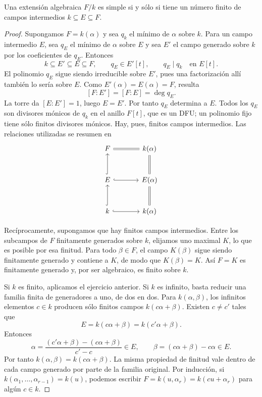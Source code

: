\begin{prop}\label{prop:C26-intermedios-simple}
Una extensión algebraica $F/k$ es simple si y sólo si tiene un número finito de campos intermedios $k\subseteq E\subseteq F$.
\end{prop}
\begin{proof}
Supongamos $F=k(\alpha)$ y sea $q_k$ el mínimo de $\alpha$ sobre $k$. Para un campo intermedio $E$, sea $q_E$ el mínimo de $\alpha$ sobre $E$ y sea $E'$ el campo generado sobre $k$ por los coeficientes de $q_E$. Entonces
\[
k\subseteq E'\subseteq E\subseteq F,
\qquad q_E\in E'[t],\qquad q_E\mid q_k\quad\text{en }E[t].
\]
El polinomio $q_E$ sigue siendo irreducible sobre $E'$, pues una factorización allí también lo sería sobre $E$. Como $E'(\alpha)=E(\alpha)=F$, resulta
\[
[F:E']=[F:E]=\deg q_E.
\]
La torre da $[E:E']=1$, luego $E=E'$. Por tanto $q_E$ determina a $E$. Todos los $q_E$ son divisores mónicos de $q_k$ en el anillo $F[t]$, que es un DFU; un polinomio fijo tiene sólo finitos divisores mónicos. Hay, pues, finitos campos intermedios. Las relaciones utilizadas se resumen en
\[
\begin{tikzcd}[column sep=large,row sep=large]
F\arrow[r,equal]&k(\alpha)\\
E\arrow[u,hook]\arrow[r,hook]&E(\alpha)\arrow[u,equal]\\
k\arrow[u,hook]\arrow[r,hook]&k(\alpha)\arrow[u,equal]
\end{tikzcd}
\]

Recíprocamente, supongamos que hay finitos campos intermedios. Entre los subcampos de $F$ finitamente generados sobre $k$, elijamos uno maximal $K$, lo que es posible por esa finitud. Para todo $\beta\in F$, el campo $K(\beta)$ sigue siendo finitamente generado y contiene a $K$, de modo que $K(\beta)=K$. Así $F=K$ es finitamente generado y, por ser algebraico, es finito sobre $k$.

Si $k$ es finito, aplicamos el ejercicio anterior. Si $k$ es infinito, basta reducir una familia finita de generadores a uno, de dos en dos. Para $k(\alpha,\beta)$, los infinitos elementos $c\in k$ producen sólo finitos campos $k(c\alpha+\beta)$. Existen $c\ne c'$ tales que
\[
E=k(c\alpha+\beta)=k(c'\alpha+\beta).
\]
Entonces
\[
\alpha=\frac{(c'\alpha+\beta)-(c\alpha+\beta)}{c'-c}\in E,
\qquad \beta=(c\alpha+\beta)-c\alpha\in E.
\]
Por tanto $k(\alpha,\beta)=k(c\alpha+\beta)$. La misma propiedad de finitud vale dentro de cada campo generado por parte de la familia original. Por inducción, si $k(\alpha_1,\ldots,\alpha_{r-1})=k(u)$, podemos escribir $F=k(u,\alpha_r)=k(cu+\alpha_r)$ para algún $c\in k$.
\end{proof}

